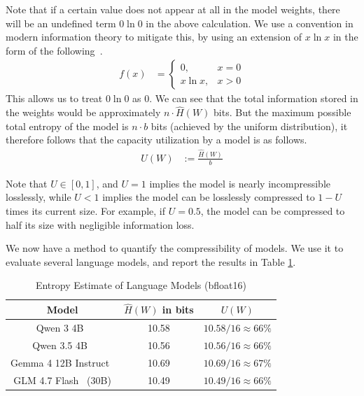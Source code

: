 \documentclass[../main.tex]{subfiles}
\begin{document}
Note that if a certain value does not appear at all in the model weights, there will be an undefined term $0\ln 0$ in the above calculation. We use a convention in modern information theory to mitigate this, by using an extension of $x\ln x$ in the form of the following~\cite[eq. 1.1.2]{ebanks1998characterizations}.
\begin{align} \label{eq:math_hack}
    f(x) &= \begin{cases}
        0, & x = 0 \\
        x\ln x, & x > 0
    \end{cases}
\end{align}
This allows us to treat $0\ln 0$ as $0$. We can see that the total information stored in the weights would be approximately $n \cdot \hat{H}(W)$ bits. But the maximum possible total entropy of the model is $n\cdot b$ bits (achieved by the uniform distribution), it therefore follows that the capacity utilization by a model is as follows.
\begin{align}
U(W) &:= \frac{\hat{H}(W)}{b}
\end{align}

Note that $U \in [0, 1]$, and $U = 1$ implies the model is nearly incompressible losslessly, while $U < 1$ implies the model can be losslessly compressed to $1 - U$ times its current size. For example, if $U = 0.5$, the model can be compressed to half its size with negligible information loss.

We now have a method to quantify the compressibility of models. We use it to evaluate several language models, and report the results in Table \ref{tab:bf16_entropy}.

\begin{table}[H]
\centering
\caption{Entropy Estimate of Language Models (bfloat16)}
\label{tab:bf16_entropy}
\begin{tabular}{|c|c|c|}
 \hline
    Model & $\hat{H}(W)$ in bits & $U(W)$ \\ \hline
    Qwen 3 4B~\cite{yangQwen3TechnicalReport2025b} & 10.58 & $10.58/16\approx66\%$ \\ \hline
    Qwen 3.5 4B~\cite{teamQwen35AcceleratingProductivity2026} & 10.56 &  $10.56/16\approx66\%$ \\ \hline
    Gemma 4 12B Instruct~\cite{teamGemma4Technical2026}& 10.69 & $10.69/16\approx67\%$ \\ \hline
    GLM 4.7 Flash~\cite{z.aiinc.GLM47AdvancingCoding2025} (30B)& 10.49 & $10.49/16\approx66\%$ \\ \hline
\end{tabular}
\end{table}
 
\end{document}
